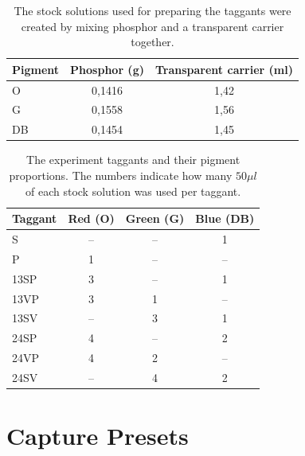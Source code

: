 \documentclass[thesis.tex]{subfiles}
\begin{document}
\vspace{-1em}
\begin{table}[ht]
  \caption{The stock solutions used for preparing the taggants were created by mixing phosphor and a transparent carrier together.}

  \begin{center}
  \begin{tabular}{| m{1.75cm} | c | c |}
    \hline
    \textbf{Pigment}  & \textbf{Phosphor (g)} & \textbf{Transparent carrier (ml)} \\ \hline
    O & 0,1416 & 1,42 \\
    \hline
    G & 0,1558 & 1,56 \\
    \hline
    DB & 0,1454 & 1,45 \\
    \hline
  \end{tabular}
  \end{center}
\end{table}
\vspace{-2.75em}
\begin{table}[ht]
  \caption{The experiment taggants and their pigment proportions. The numbers indicate how many $50\mu l$ of each stock solution was used per taggant.}

  \begin{center}
  \begin{tabular}{| m{1.75cm} | c | c | c |}
    \hline
    \textbf{Taggant}  & \textbf{Red (O)} & \textbf{Green (G)} & \textbf{Blue (DB)} \\ \hline
    S & -- & -- & 1 \\
    \hline
    P & 1 & -- & -- \\
    \hline
    13SP & 3 & -- & 1 \\
    \hline
    13VP & 3 & 1 & -- \\
    \hline
    13SV & -- & 3 & 1 \\
    \hline
    24SP & 4 & -- & 2 \\
    \hline
    24VP  & 4 & 2 & -- \\
    \hline
    24SV & -- & 4 & 2 \\
    \hline
  \end{tabular}
  \end{center}
\end{table}

\chapter{Capture Presets}
\label{appendix:capture-presets}
\end{document}
